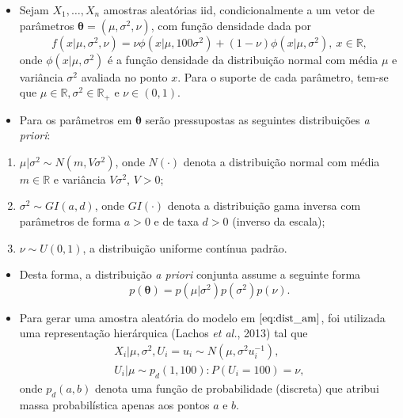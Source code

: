 \documentclass[9pt]{beamer}
\begin{document}
\begin{frame}
\begin{itemize}
\justifying	
\item Sejam $X_{1}, \ldots, X_{n}$ amostras aleatórias iid, condicionalmente a um vetor de parâmetros $\boldsymbol{\theta} = (\mu, \sigma^2, \nu)$, com função densidade dada por
\begin{equation}\label{eq:dist_am}
f(x | \mu, \sigma^2, \nu) = \nu \phi(x | \mu, 100 \sigma^2) + (1 - \nu) \phi(x | \mu, \sigma^2), \ x \in \mathbb{R},
\end{equation}
\noindent onde $\phi(x | \mu, \sigma^2)$ é a função densidade da distribuição normal com média $\mu$ e variância $\sigma^2$ avaliada no ponto $x$. Para o suporte de cada parâmetro, tem-se que $\mu \in \mathbb{R}, \sigma^2 \in \mathbb{R}_+$ e $\nu \in (0,1)$.
\item Para os parâmetros em $\boldsymbol{\theta}$ serão pressupostas as seguintes distribuições \textit{a priori}:
\end{itemize}
\begin{enumerate}
	\justifying
	\item $\mu | \sigma^2 \sim{N} (m, V \sigma^2)$, onde $N(\cdot)$ denota a distribuição normal com média $m \in \mathbb{R}$ e variância $V \sigma^2$, $V > 0$;
	\item $\sigma^2 \sim{GI} (a,d)$, onde $GI(\cdot)$ denota a distribuição gama inversa com parâmetros de forma $a > 0$ e de taxa $d > 0$ (inverso da escala);
	\item $\nu \sim{U}(0,1)$, a distribuição uniforme contínua padrão.
\end{enumerate}
\end{frame}
\begin{frame}
\begin{itemize}
\justifying	
\item Desta forma, a distribuição \textit{a priori} conjunta assume a seguinte forma
\begin{equation}
p(\boldsymbol{\theta}) = p(\mu|\sigma^2) p(\sigma^2)p(\nu).
\end{equation}
\item Para gerar uma amostra aleatória do modelo em $\eqref{eq:dist_am}$, foi utilizada uma representação hierárquica (Lachos \textit{et al.}, 2013) tal que
\begin{gather}
X_i | \mu, \sigma^2, U_{i} = u_i \sim{N}(\mu, \sigma^2 u_i^{-1}), \nonumber \\
U_i | \mu \sim{p_d}(1,100) : P(U_i = 100) = \nu, \label{eq:hier}
\end{gather}
\noindent onde $p_d(a,b)$ denota uma função de probabilidade (discreta) que atribui massa probabilística apenas aos pontos $a$ e $b$.
\end{itemize}
\end{frame}
\end{document}
